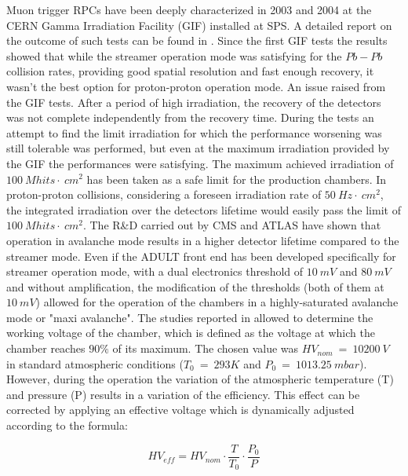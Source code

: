 Muon trigger RPCs have been deeply characterized in 2003 and 2004 at the CERN Gamma Irradiation Facility (GIF) installed at SPS.
A detailed report on the outcome of such tests can be found in \cite{arnaldi:2004}.
Since the first GIF tests the results showed that while the streamer operation mode was satisfying for the $Pb-Pb$ collision rates, providing good spatial resolution and fast enough recovery, it wasn't the best option for proton-proton operation mode.
An issue raised from the GIF tests.
After a period of high irradiation, the recovery of the detectors was not complete independently from the recovery time.
During the tests an attempt to find the limit irradiation for which the performance worsening was still tolerable was performed, but even at the maximum irradiation provided by the GIF the performances were satisfying.
The maximum achieved irradiation of $100\ Mhits\cdot~cm^2$ has been taken as a safe limit for the production chambers.
In proton-proton collisions, considering a foreseen irradiation rate of $50\ Hz\cdot~cm^2$, the integrated irradiation over the detectors lifetime would easily pass the limit of $100\ Mhits\cdot~cm^2$.
The R\&D carried out by CMS and ATLAS have shown that operation in avalanche mode results in a higher detector lifetime compared to the streamer mode.
Even if the ADULT front end has been developed specifically for streamer operation mode, with a dual electronics threshold of $10\ mV$ and $80\ mV$ and without amplification, the modification of the thresholds (both of them at $10\ mV$) allowed for the operation of the chambers in a highly-saturated avalanche mode or "maxi avalanche".
% 
The studies reported in \cite{arnaldi:2004} allowed to determine the working voltage of the chamber, which is defined as the voltage at which the chamber reaches $90\%$ of its maximum.
The chosen value was $HV_{nom}\ =\ 10200\ V$ in standard atmospheric conditions ($T_0\ =\ 293K$ and $P_0\ =\ 1013.25\ mbar$).
However, during the operation the variation of the atmospheric temperature (T) and pressure (P) results in a variation of the efficiency.
This effect can be corrected by applying an effective voltage which is dynamically adjusted according to the formula:

\begin{equation}
\label{eq:HVcorrection}
HV_{eff} = HV_{nom}\cdot \frac{T}{T_0} \cdot \frac{P_0}{P}
\end{equation}

